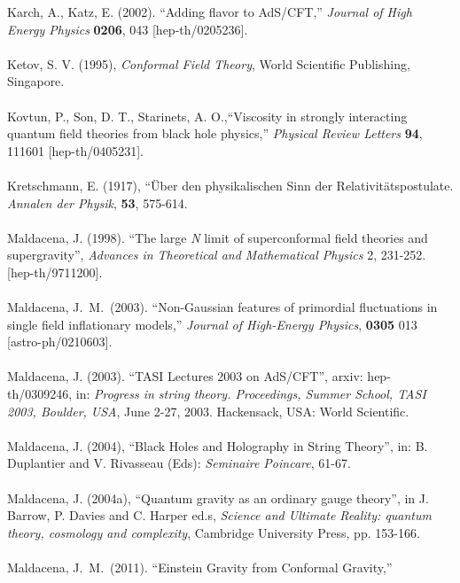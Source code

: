 \documentclass[12pt]{article}
\renewcommand{\^}[1]{\hat{#1}}
\begin{document}
Karch, A., Katz, E. (2002). ``Adding flavor to AdS/CFT,''
  {\it Journal of High Energy Physics} {\bf 0206}, 043 
  [hep-th/0205236].\\
  \\
Ketov, S. V. (1995), {\it Conformal Field Theory}, World Scientific Publishing, Singapore. \\
\\
Kovtun, P., Son, D. T., Starinets, A. O.,``Viscosity in strongly interacting quantum field theories from black hole physics,''
  {\it Physical Review Letters}  {\bf 94}, 111601 
  [hep-th/0405231].\\
  \\
Kretschmann, E. (1917), ``{\"{U}}ber den physikalischen Sinn der Relativit{\"{a}}tspostulate.
{\it Annalen der Physik}, {\bf 53}, 575-614.\\
\\
Maldacena, J. (1998). ``The large \emph{N} limit of superconformal field theories and supergravity'',  \emph{Advances in Theoretical and Mathematical Physics} 2, 231-252.
  [hep-th/9711200].\\
\\
Maldacena, J.~M.~(2003). ``Non-Gaussian features of primordial fluctuations in single field inflationary models,''
{\it Journal of High-Energy Physics}, {\bf 0305} 013
  [astro-ph/0210603].\\
\\
Maldacena, J. (2003). ``TASI Lectures 2003 on AdS/CFT'', arxiv: hep-th/0309246, in: {\it Progress in string theory. Proceedings, Summer School, TASI 2003, Boulder, USA}, June 2-27, 2003.
Hackensack, USA: World Scientific. \\
\\
Maldacena, J. (2004), ``Black Holes and Holography in String Theory'', in: B. Duplantier and V. Rivasseau (Eds): {\it Seminaire Poincare}, 61-67.\\
\\
Maldacena, J. (2004a), ``Quantum gravity as an ordinary gauge theory'', in J. Barrow, P. Davies and C. Harper ed.s, {\em Science and Ultimate Reality: quantum theory, cosmology and complexity}, Cambridge University Press, pp. 153-166. \\
\\
Maldacena, J.~M.~(2011). ``Einstein Gravity from Conformal Gravity,''
\end{document}
